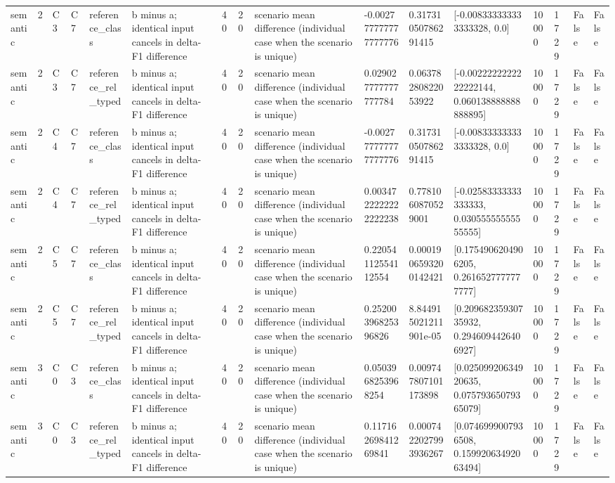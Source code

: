 \begin{tabular}{llllllllllllllll}
semantic & 2 & C3 & C7 & reference\_class & b minus a; identical input cancels in delta-F1 difference & 40 & 20 & scenario mean difference (individual case when the scenario is unique) & -0.002777777777777776 & 0.31731050786291415 & [-0.008333333333333328, 0.0] & 10000 & 1729 & False & False \\
semantic & 2 & C3 & C7 & reference\_rel\_typed & b minus a; identical input cancels in delta-F1 difference & 40 & 20 & scenario mean difference (individual case when the scenario is unique) & 0.029027777777777784 & 0.06378280822053922 & [-0.0022222222222222144, 0.060138888888888895] & 10000 & 1729 & False & False \\
semantic & 2 & C4 & C7 & reference\_class & b minus a; identical input cancels in delta-F1 difference & 40 & 20 & scenario mean difference (individual case when the scenario is unique) & -0.002777777777777776 & 0.31731050786291415 & [-0.008333333333333328, 0.0] & 10000 & 1729 & False & False \\
semantic & 2 & C4 & C7 & reference\_rel\_typed & b minus a; identical input cancels in delta-F1 difference & 40 & 20 & scenario mean difference (individual case when the scenario is unique) & 0.0034722222222222238 & 0.7781060870529001 & [-0.02583333333333333, 0.03055555555555555] & 10000 & 1729 & False & False \\
semantic & 2 & C5 & C7 & reference\_class & b minus a; identical input cancels in delta-F1 difference & 40 & 20 & scenario mean difference (individual case when the scenario is unique) & 0.22054112554112554 & 0.0001906593200142421 & [0.1754906204906205, 0.2616527777777777] & 10000 & 1729 & False & False \\
semantic & 2 & C5 & C7 & reference\_rel\_typed & b minus a; identical input cancels in delta-F1 difference & 40 & 20 & scenario mean difference (individual case when the scenario is unique) & 0.25200396825396826 & 8.844915021211901e-05 & [0.20968235930735932, 0.2946094426406927] & 10000 & 1729 & False & False \\
semantic & 3 & C0 & C3 & reference\_class & b minus a; identical input cancels in delta-F1 difference & 40 & 20 & scenario mean difference (individual case when the scenario is unique) & 0.0503968253968254 & 0.009747807101173898 & [0.02509920634920635, 0.07579365079365079] & 10000 & 1729 & False & False \\
semantic & 3 & C0 & C3 & reference\_rel\_typed & b minus a; identical input cancels in delta-F1 difference & 40 & 20 & scenario mean difference (individual case when the scenario is unique) & 0.11716269841269841 & 0.0007422027993936267 & [0.0746999007936508, 0.15992063492063494] & 10000 & 1729 & False & False \\

\end{tabular}
